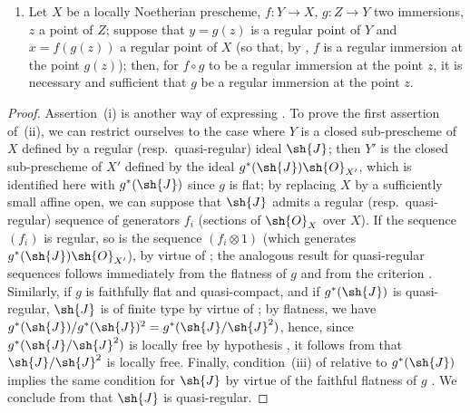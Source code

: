 \begin{proposition}[19.1.5]
\begin{enumerate}[label=(\roman*)]
\begin{enumerate}[label=\emph{\alph*)}]
  \end{enumerate}
  \item Let $X$ be a locally Noetherian prescheme, $f:Y\to X$, $g:Z\to Y$ two immersions, $z$ a point of $Z$; suppose that $y=g(z)$ is a regular point of $Y$ and $x=f(g(z))$ a regular point
of $X$ (so that, by , $f$ is a regular immersion at the point $g(z)$); then,
for $f\circ g$ to be a regular immersion at the point $z$, it is necessary and sufficient that $g$ be a regular immersion at the point $z$.
\end{enumerate}
\end{proposition}

\begin{proof}
Assertion~(i) is another way of expressing .
To prove the first assertion of~(ii), we can restrict ourselves to the case where $Y$ is a closed sub-prescheme of $X$ defined by a regular (resp.\ quasi-regular) ideal $\sh{J}$; then $Y'$ is the closed sub-prescheme of $X'$ defined by the ideal $g^*(\sh{J})\sh{O}_{X'}$, which is identified here with $g^*(\sh{J})$ since $g$ is flat; by replacing $X$ by a sufficiently small affine open, we can suppose that $\sh{J}$ admits a regular (resp.\ quasi-regular) sequence of generators $f_i$ (sections of $\sh{O}_X$ over $X$).
If the sequence $(f_i)$ is regular, so is the sequence $(f_i\otimes 1)$ (which generates $g^*(\sh{J})\sh{O}_{X'}$), by virtue of ; the analogous result for quasi-regular sequences follows immediately from the flatness of $g$ and from the criterion .
Similarly, if $g$ is faithfully flat and quasi-compact, and if $g^*(\sh{J})$ is quasi-regular, $\sh{J}$ is of finite type by virtue of ; by flatness, we have $g^*(\sh{J})/g^*(\sh{J})^2=g^*(\sh{J}/\sh{J}^2)$, hence, since $g^*(\sh{J}/\sh{J}^2)$ is locally free by hypothesis , it follows from  that $\sh{J}/\sh{J}^2$ is locally free.
Finally, condition~(iii) of  relative to $g^*(\sh{J})$ implies the same condition for $\sh{J}$ by virtue of the faithful flatness of $g$ .
We conclude from  that $\sh{J}$ is quasi-regular.


\end{proof}
